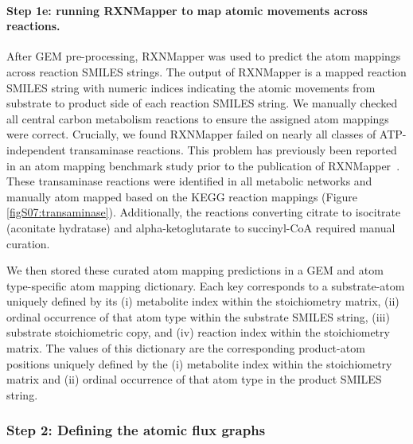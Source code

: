 \documentclass[12pt]{article}
\begin{document}
\paragraph{Step 1e: running RXNMapper to map atomic movements across reactions.}

After GEM pre-processing, RXNMapper was used to predict the atom mappings
across reaction SMILES strings. The output of RXNMapper is a mapped
reaction SMILES string with numeric indices indicating the atomic
movements from substrate to product side of each reaction SMILES string.
We manually checked all central carbon metabolism reactions to ensure the
assigned atom mappings were correct. Crucially, we found RXNMapper failed
on nearly all classes of ATP-independent transaminase reactions. This
problem has previously been reported in an atom mapping benchmark study
prior to the publication of
RXNMapper~\citep{PreciatGonzalezGermanA.2017Ceoa}. These transaminase
reactions were identified in all metabolic networks and manually atom
mapped based on the KEGG reaction mappings (Figure
\ref{figS07:transaminase}). Additionally, the reactions converting citrate
to isocitrate (aconitate hydratase) and alpha-ketoglutarate to
succinyl-CoA required manual curation.

We then stored these curated atom mapping predictions in a GEM and atom
type-specific atom mapping dictionary. Each key corresponds to
a substrate-atom uniquely defined by its (i) metabolite index within the
stoichiometry matrix, (ii) ordinal occurrence of that atom type within the
substrate SMILES string, (iii) substrate stoichiometric copy, and (iv)
reaction index within the stoichiometry matrix. The values of this
dictionary are the corresponding product-atom positions uniquely defined
by the (i) metabolite index within the stoichiometry matrix and (ii)
ordinal occurrence of that atom type in the product SMILES string.

\subsubsection*{Step 2: Defining the atomic flux graphs}
\end{document}
